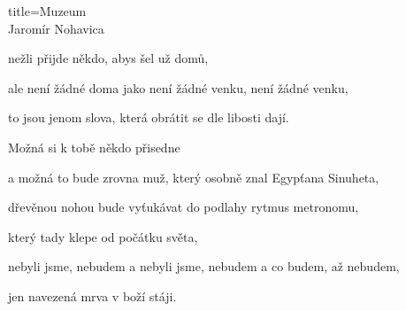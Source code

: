 \begin{song}{title=\predtitle\centering Muzeum \\\large Jaromír Nohavica  \vspace*{-0.3cm}}
\begin{centerjustified}
	nežli přijde někdo, abys šel už domů,
	
	ale není žádné doma jako není žádné venku, není žádné venku,
	
	to jsou jenom slova, která obrátit se dle libosti dají.


\sloka
	Možná si k tobě někdo přisedne
	
	a možná to bude zrovna muž, který osobně znal Egypťana Sinuheta,
	
	dřevěnou nohou bude vyťukávat do podlahy rytmus metronomu,
	
	který tady klepe od počátku světa,
	
	nebyli jsme, nebudem a nebyli jsme, nebudem a co budem, až nebudem,
	
	jen navezená mrva v boží stáji.
	
	

\end{centerjustified}
\setcounter{Slokočet}{0}
\end{song}
